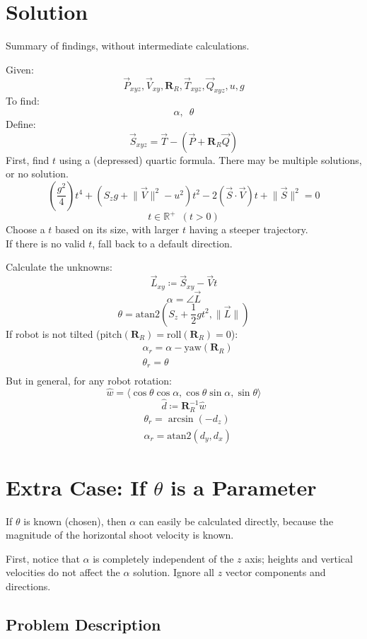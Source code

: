 \documentclass{article}
\begin{document}
\section*{Solution}
Summary of findings, without intermediate calculations.

Given:
\[ \vec{P}_{xyz}, \vec{V}_{xy},\boldsymbol{R}_R,\vec{T}_{xyz},\vec{Q}_{xyz},u,g \]
To find:
\[ \alpha,\enspace\theta \]
Define:
\[ \vec{S}_{xyz}=\vec{T}-(\vec{P}+\boldsymbol{R}_R\vec{Q}) \]
First, find $t$ using a (depressed) quartic formula. There may be multiple solutions, or no solution.
\[ \left(\frac{g^2}{4}\right)t^4+(S_zg+\lVert\vec{V}\rVert^2-u^2)t^2-2(\vec{S}\cdot\vec{V})t+\lVert\vec{S}\rVert^2=0 \]
\[ t\in\mathbb{R}^+\enspace(t>0) \]
Choose a $t$ based on its size, with larger $t$ having a steeper trajectory. \\
If there is no valid $t$, fall back to a default direction.

Calculate the unknowns:
\[ \vec{L}_{xy}\coloneqq\vec{S}_{xy}-\vec{V}t \]
\[ \boxed{\alpha=\angle\vec{L}} \]
\[ \boxed{\theta=\text{atan2}(S_z+\frac{1}{2}gt^2,\lVert\vec{L}\rVert)} \]
If robot is not tilted ($\text{pitch}(\boldsymbol{R}_R)=\text{roll}(\boldsymbol{R}_R)=0$):
\begin{align*}
    &\boxed{\alpha_r=\alpha-\text{yaw}(\boldsymbol{R}_R)} \\
    &\boxed{\theta_r=\theta} \\
\end{align*}
But in general, for any robot rotation:
\[ \hat{w}=\langle\cos\theta\cos\alpha,\cos\theta\sin\alpha,\sin\theta\rangle \]
\[ \hat{d}\coloneqq\boldsymbol{R}_R^{-1}\hat{w} \]
\begin{align*}
    &\boxed{\theta_r=\arcsin(-d_z)} \\
    &\boxed{\alpha_r=\text{atan2}(d_y,d_x)}
\end{align*}

\section*{Extra Case: If $\theta$ is a Parameter}
If $\theta$ is known (chosen), then $\alpha$ can easily be calculated directly, because the magnitude of the horizontal shoot velocity is known.

First, notice that $\alpha$ is completely independent of the $z$ axis; heights and vertical velocities do not affect the $\alpha$ solution. Ignore all $z$ vector components and directions.

\subsection*{Problem Description}
\end{document}
